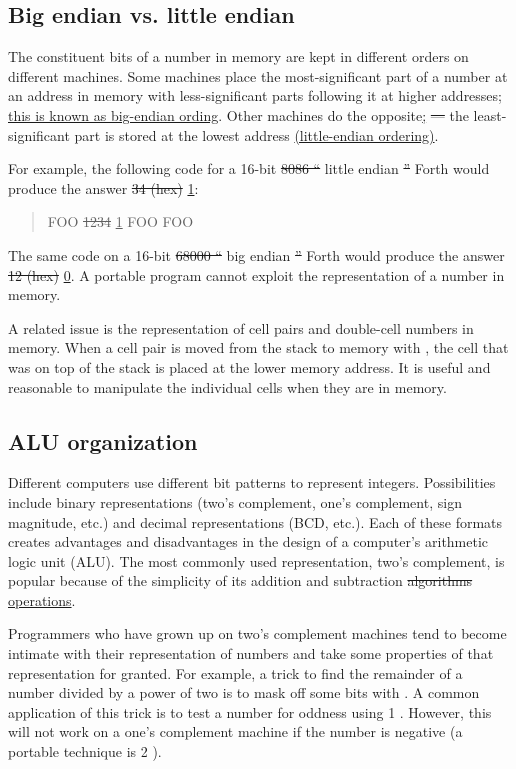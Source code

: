 \subsection{Big endian vs. little endian} %

The constituent bits of a number in memory are kept in different
orders on different machines. Some machines place the most-significant
part of a number at an address in memory with less-significant parts
following it at higher addresses\uline{; this is known as big-endian
ording}. Other machines do the opposite\uline{;} \sout{---} the
least-significant part is stored at the lowest address \uline{(little-endian
ordering)}.

For example, the following code for a 16-bit \sout{8086 ``} little endian \sout{''} Forth
would produce the answer \sout{34 (hex)} \uline{1}:
\begin{quote}\ttfamily
	 FOO
	\quad \sout{ 1234} \uline{1} FOO \word{!}
	\quad FOO 
\end{quote}

The same code on a 16-bit \sout{68000 ``} big endian \sout{''} Forth would produce the
answer \sout{12 (hex)} \uline{0}. A portable program cannot exploit the representation
of a number in memory.

A related issue is the representation of cell pairs and double-cell
numbers in memory. When a cell pair is moved from the stack to memory
with , the cell that was on top of the stack is placed at the
lower memory address. It is useful and reasonable to manipulate the
individual cells when they are in memory.

\subsection{ALU organization} %

Different computers use different bit patterns to represent integers.
Possibilities include binary representations (two's complement, one's
complement, sign magnitude, etc.) and decimal representations (BCD,
etc.). Each of these formats creates advantages and disadvantages in
the design of a computer's arithmetic logic unit (ALU). The most
commonly used representation, two's complement, is popular because of
the simplicity of its addition and subtraction \sout{algorithms} \uline{operations}.

Programmers who have grown up on two's complement machines tend to
become intimate with their representation of numbers and take some
properties of that representation for granted. For example, a trick
to find the remainder of a number divided by a power of two is to mask
off some bits with . A common application of this trick is
to test a number for oddness using 1 . However, this will
not work on a one's complement machine if the number is negative (a
portable technique is 2 ).

